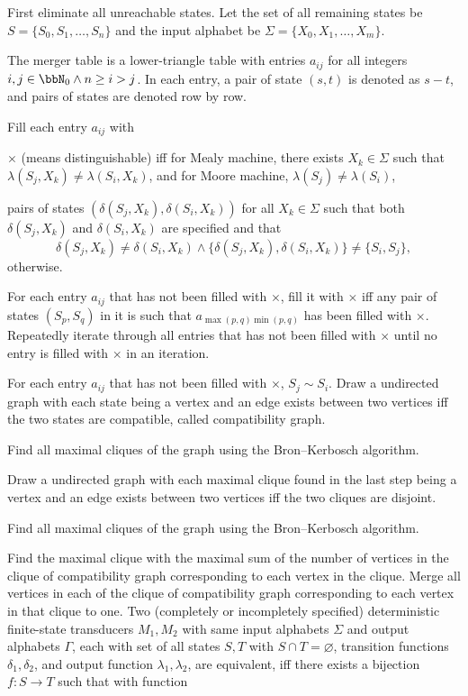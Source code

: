 \documentclass[a4paper,12pt]{report}
\begin{document}
First eliminate all unreachable states. Let the set of all remaining states be $S=\{S_0,S_1,\ldots,S_n\}$ and the input alphabet be $\Sigma=\{X_0,X_1,\ldots,X_m\}$.
\ben
\item The merger table is a lower-triangle table with entries $a_{ij}$ for all integers $i,j\in\bbN_0\land n\geq i>j$. In each entry, a pair of state $(s,t)$ is denoted as $s-t$, and pairs of states are denoted row by row.
\item Fill each entry $a_{ij}$ with
\bit
\item $\times$ (means distinguishable) iff for Mealy machine, there exists $X_k\in\Sigma$ such that $\lambda(S_j,X_k)\neq\lambda(S_i,X_k)$, and for Moore machine, $\lambda(S_j)\neq\lambda(S_i)$,
\item pairs of states $(\delta(S_j,X_k),\delta(S_i,X_k))$ for all $X_k\in\Sigma$ such that both $\delta(S_j,X_k)$ and $\delta(S_i,X_k)$ are specified and that
\[\delta(S_j,X_k)\neq\delta(S_i,X_k)\land\{\delta(S_j,X_k),\delta(S_i,X_k)\}\neq\{S_i,S_j\},\]
otherwise.
\eit
\item For each entry $a_{ij}$ that has not been filled with $\times$, fill it with $\times$ iff any pair of states $(S_p,S_q)$ in it is such that $a_{\max(p,q)\min(p,q)}$ has been filled with $\times$. Repeatedly iterate through all entries that has not been filled with $\times$ until no entry is filled with $\times$ in an iteration.
\item For each entry $a_{ij}$ that has not been filled with $\times$, $S_j\sim S_i$. Draw a undirected graph with each state being a vertex and an edge exists between two vertices iff the two states are compatible, called compatibility graph.
\item Find all maximal cliques of the graph using the Bron–Kerbosch algorithm.
\item Draw a undirected graph with each maximal clique found in the last step being a vertex and an edge exists between two vertices iff the two cliques are disjoint.
\item Find all maximal cliques of the graph using the Bron–Kerbosch algorithm.
\item Find the maximal clique with the maximal sum of the number of vertices in the clique of compatibility graph corresponding to each vertex in the clique. Merge all vertices in each of the clique of compatibility graph corresponding to each vertex in that clique to one.
\een
{}
Two (completely or incompletely specified) deterministic finite-state transducers $M_1,M_2$ with same input alphabets $\Sigma$ and output alphabets $\Gamma$, each with set of all states $S,T$ with $S\cap T=\varnothing$, transition functions $\delta_1,\delta_2$, and output function $\lambda_1,\lambda_2$, are equivalent, iff there exists a bijection $f\colon S\to T$ such that with function
\end{document}
